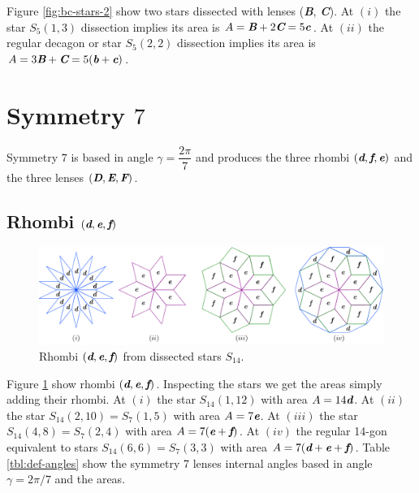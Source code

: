 \documentclass[11pt]{article}
\def\mathbi#1{\textbf{\em #1}}
\begin{document}
Figure \ref{fig:bc-stars-2} show two stars dissected with lenses (\mathbi{B}, \mathbi{C}).
At $(i)$ the star $S_5(1,3)$ dissection implies its area is $A = \mathbi{B} + 2\mathbi{C} = 5\mathbi{c}$.
At $(ii)$ the regular decagon or star $S_5(2,2)$ dissection implies its area is $A = 3\mathbi{B} + \mathbi{C} = 5(\mathbi{b} + \mathbi{c})$.



\section{Symmetry $7$}

Symmetry $7$ is based in angle $\gamma = \dfrac{2\pi}7$ and produces the three rhombi $(\mathbi{d},\mathbi{f},\mathbi{e})$ and the three lenses $(\mathbi{D},\mathbi{E},\mathbi{F})$.

\subsection{Rhombi $(\mathbi{d},\mathbi{e},\mathbi{f})$}

\begin{figure}[H]
\centering
\includegraphics[scale=1]{def/rhombi}
\caption{Rhombi $(\mathbi{d},\mathbi{e},\mathbi{f})$ from dissected stars $S_{14}$. }
\label{fig:def-rhombi}
\end{figure}

Figure \ref{fig:def-rhombi} show rhombi $(\mathbi{d},\mathbi{e},\mathbi{f})$. 
Inspecting the stars we get the areas simply adding their rhombi.
At $(i)$ the star $S_{14}(1,12)$ with area $A = 14\mathbi{d}$. 
At $(ii)$ the star $S_{14}(2,10) = S_7(1,5)$ with area $A = 7\mathbi{e}$.
At $(iii)$ the star $S_{14}(4,8) = S_7(2,4)$ with area $A = 7(\mathbi{e} + \mathbi{f})$.
At $(iv)$ the regular 14-gon equivalent to stars $S_{14}(6,6) = S_7(3,3)$ with area $A = 7(\mathbi{d} + \mathbi{e} + \mathbi{f})$.
Table \ref{tbl:def-angles} show the symmetry 7 lenses internal angles based in angle $\gamma = 2\pi/7$ and the areas.
\end{document}
